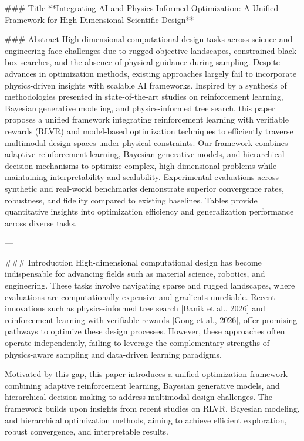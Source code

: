 ### Title  
**Integrating AI and Physics-Informed Optimization: A Unified Framework for High-Dimensional Scientific Design**

### Abstract  
High-dimensional computational design tasks across science and engineering face challenges due to rugged objective landscapes, constrained black-box searches, and the absence of physical guidance during sampling. Despite advances in optimization methods, existing approaches largely fail to incorporate physics-driven insights with scalable AI frameworks. Inspired by a synthesis of methodologies presented in state-of-the-art studies on reinforcement learning, Bayesian generative modeling, and physics-informed tree search, this paper proposes a unified framework integrating reinforcement learning with verifiable rewards (RLVR) and model-based optimization techniques to efficiently traverse multimodal design spaces under physical constraints. Our framework combines adaptive reinforcement learning, Bayesian generative models, and hierarchical decision mechanisms to optimize complex, high-dimensional problems while maintaining interpretability and scalability. Experimental evaluations across synthetic and real-world benchmarks demonstrate superior convergence rates, robustness, and fidelity compared to existing baselines. Tables provide quantitative insights into optimization efficiency and generalization performance across diverse tasks.  

---

### Introduction  
High-dimensional computational design has become indispensable for advancing fields such as material science, robotics, and engineering. These tasks involve navigating sparse and rugged landscapes, where evaluations are computationally expensive and gradients unreliable. Recent innovations such as physics-informed tree search [Banik et al., 2026] and reinforcement learning with verifiable rewards [Gong et al., 2026], offer promising pathways to optimize these design processes. However, these approaches often operate independently, failing to leverage the complementary strengths of physics-aware sampling and data-driven learning paradigms.

Motivated by this gap, this paper introduces a unified optimization framework combining adaptive reinforcement learning, Bayesian generative models, and hierarchical decision-making to address multimodal design challenges. The framework builds upon insights from recent studies on RLVR, Bayesian modeling, and hierarchical optimization methods, aiming to achieve efficient exploration, robust convergence, and interpretable results.

